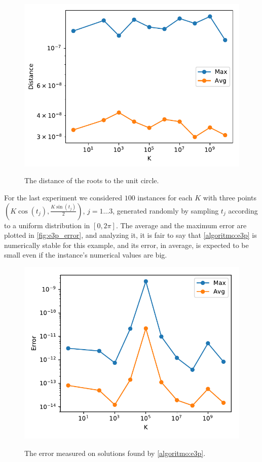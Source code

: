 \begin{figure}
	\centering
	\caption{The distance of the roots to the unit circle.}
	\includegraphics[scale=.75]{tex/figures/e3p_known_sols2}
	\fautor
	\label{fig:e3p_known_sols2}
\end{figure}

For the last experiment we considered $100$ instances for each $K$ with three points $(K\cos(t_j), \frac{K\sin{(t_j)}}{2})$, $j=1\dots3$, generated randomly by sampling $t_j$ according to a uniform distribution in $[0, 2\pi]$. The average and the maximum error are plotted in \autoref{fig:e3p_error}, and analyzing it, it is fair to say that \autoref{algoritmo:e3p} is numerically stable for this example, and its error, in average, is expected to be small even if the instance's numerical values are big.
\begin{figure}[H]
	\centering
	\caption{The error measured on solutions found by \autoref{algoritmo:e3p}.}
	\includegraphics[scale=.75]{tex/figures/e3p_error}
	\fautor
	\label{fig:e3p_error}
\end{figure}
